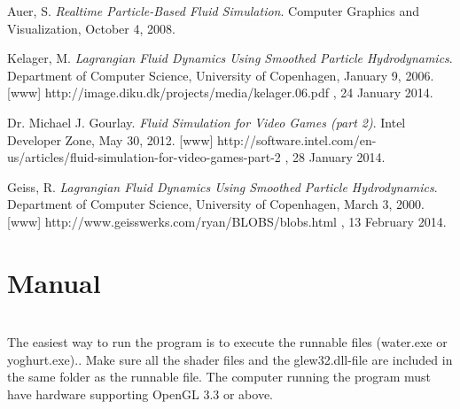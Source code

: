 \documentclass[a4paper,12pt,twoside,final]{report}
\begin{document}






\begin{thebibliography}{11}

  Auer, S.
  \emph{Realtime Particle-Based Fluid Simulation}.
  Computer Graphics and Visualization,
  October 4,
  2008.
  
  Kelager, M.
  \emph{Lagrangian Fluid Dynamics Using Smoothed Particle Hydrodynamics}.
  Department of Computer Science, University of Copenhagen,
  January 9,
  2006.
  [www] http://image.diku.dk/projects/media/kelager.06.pdf , 24 January 2014.
  
    Dr. Michael J. Gourlay.
  \emph{Fluid Simulation for Video Games (part 2)}.
  Intel Developer Zone,
  May 30,
  2012.
  [www] http://software.intel.com/en-us/articles/fluid-simulation-for-video-games-part-2 , 28 January 2014.  
  
  Geiss, R.
  \emph{Lagrangian Fluid Dynamics Using Smoothed Particle Hydrodynamics}.
  Department of Computer Science, University of Copenhagen,
  March 3,
  2000.
  [www] http://www.geisswerks.com/ryan/BLOBS/blobs.html , 13 February 2014.
  

  
\end{thebibliography}

\newpage


\appendix
\chapter{Manual}
 \\
\noindent The easiest way to run the program is to execute the runnable files (water.exe or yoghurt.exe).. Make sure all the shader files and the glew32.dll-file are included in the same folder as the runnable file. The computer running the program must have hardware supporting OpenGL 3.3 or above.
\end{document}
